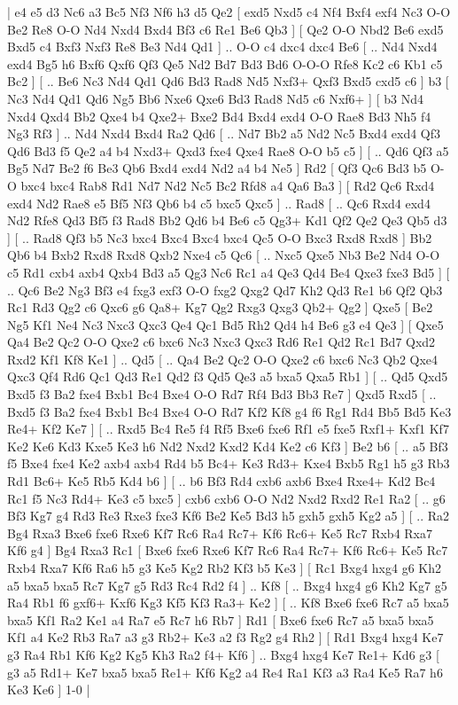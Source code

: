 \makegametitle 
|   e4   e5    d3   Nc6    a3   Bc5    Nf3   Nf6    h3   d5    Qe2 [  exd5 Nxd5  c4 Nf4  Bxf4 exf4  Nc3 O-O  Be2 Re8  O-O Nd4  Nxd4 Bxd4  Bf3 c6  Re1 Be6  Qb3   ]  [  Qe2 O-O  Nbd2 Be6  exd5 Bxd5  c4 Bxf3  Nxf3 Re8  Be3 Nd4  Qd1   ] .. O-O    c4   dxc4    dxc4   Be6 [ .. Nd4  Nxd4 exd4  Bg5 h6  Bxf6 Qxf6  Qf3 Qe5  Nd2 Bd7  Bd3 Bd6  O-O-O Rfe8  Kc2 c6  Kb1 c5  Bc2   ]  [ .. Be6  Nc3 Nd4  Qd1 Qd6  Bd3 Rad8  Nd5 Nxf3+  Qxf3 Bxd5  cxd5 c6   ]  b3 [  Nc3 Nd4  Qd1 Qd6  Ng5 Bb6  Nxe6 Qxe6  Bd3 Rad8  Nd5 c6  Nxf6+   ]  [  b3 Nd4  Nxd4 Qxd4  Bb2 Qxe4  b4 Qxe2+  Bxe2 Bd4  Bxd4 exd4  O-O Rae8  Bd3 Nh5  f4 Ng3  Rf3   ] .. Nd4    Nxd4   Bxd4    Ra2   Qd6 [ .. Nd7  Bb2 a5  Nd2 Nc5  Bxd4 exd4  Qf3 Qd6  Bd3 f5  Qe2 a4  b4 Nxd3+  Qxd3 fxe4  Qxe4 Rae8  O-O b5  c5   ]  [ .. Qd6  Qf3 a5  Bg5 Nd7  Be2 f6  Be3 Qb6  Bxd4 exd4  Nd2 a4  b4 Ne5   ]  Rd2 [  Qf3 Qc6  Bd3 b5  O-O bxc4  bxc4 Rab8  Rd1 Nd7  Nd2 Nc5  Bc2 Rfd8  a4 Qa6  Ba3   ]  [  Rd2 Qc6  Rxd4 exd4  Nd2 Rae8  e5 Bf5  Nf3 Qb6  b4 c5  bxc5 Qxc5   ] .. Rad8 [ .. Qc6  Rxd4 exd4  Nd2 Rfe8  Qd3 Bf5  f3 Rad8  Bb2 Qd6  b4 Be6  c5 Qg3+  Kd1 Qf2  Qe2 Qe3  Qb5 d3   ]  [ .. Rad8  Qf3 b5  Nc3 bxc4  Bxc4 Bxc4  bxc4 Qc5  O-O Bxc3  Rxd8 Rxd8   ]  Bb2   Qb6    b4   Bxb2    Rxd8   Rxd8    Qxb2   Nxe4    c5   Qc6 [ .. Nxc5  Qxe5 Nb3  Be2 Nd4  O-O c5  Rd1 cxb4  axb4 Qxb4  Bd3 a5  Qg3 Nc6  Rc1 a4  Qe3 Qd4  Be4 Qxe3  fxe3 Bd5   ]  [ .. Qc6  Be2 Ng3  Bf3 e4  fxg3 exf3  O-O fxg2  Qxg2 Qd7  Kh2 Qd3  Re1 b6  Qf2 Qb3  Rc1 Rd3  Qg2 c6  Qxc6 g6  Qa8+ Kg7  Qg2 Rxg3  Qxg3 Qb2+  Qg2   ]  Qxe5 [  Be2 Ng5  Kf1 Ne4  Nc3 Nxc3  Qxc3 Qe4  Qc1 Bd5  Rh2 Qd4  h4 Be6  g3 e4  Qe3   ]  [  Qxe5 Qa4  Be2 Qc2  O-O Qxe2  c6 bxc6  Nc3 Nxc3  Qxc3 Rd6  Re1 Qd2  Rc1 Bd7  Qxd2 Rxd2  Kf1 Kf8  Ke1   ] .. Qd5 [ .. Qa4  Be2 Qc2  O-O Qxe2  c6 bxc6  Nc3 Qb2  Qxe4 Qxc3  Qf4 Rd6  Qc1 Qd3  Re1 Qd2  f3 Qd5  Qe3 a5  bxa5 Qxa5  Rb1   ]  [ .. Qd5  Qxd5 Bxd5  f3 Ba2  fxe4 Bxb1  Bc4 Bxe4  O-O Rd7  Rf4 Bd3  Bb3 Re7   ]  Qxd5   Rxd5 [ .. Bxd5  f3 Ba2  fxe4 Bxb1  Bc4 Bxe4  O-O Rd7  Kf2 Kf8  g4 f6  Rg1 Rd4  Bb5 Bd5  Ke3 Re4+  Kf2 Ke7   ]  [ .. Rxd5  Bc4 Re5  f4 Rf5  Bxe6 fxe6  Rf1 e5  fxe5 Rxf1+  Kxf1 Kf7  Ke2 Ke6  Kd3 Kxe5  Ke3 h6  Nd2 Nxd2  Kxd2 Kd4  Ke2 c6  Kf3   ]  Be2   b6 [ .. a5  Bf3 f5  Bxe4 fxe4  Ke2 axb4  axb4 Rd4  b5 Bc4+  Ke3 Rd3+  Kxe4 Bxb5  Rg1 h5  g3 Rb3  Rd1 Bc6+  Ke5 Rb5  Kd4 b6   ]  [ .. b6  Bf3 Rd4  cxb6 axb6  Bxe4 Rxe4+  Kd2 Bc4  Rc1 f5  Nc3 Rd4+  Ke3 c5  bxc5   ]  cxb6   cxb6    O-O   Nd2    Nxd2   Rxd2    Re1   Ra2 [ .. g6  Bf3 Kg7  g4 Rd3  Re3 Rxe3  fxe3 Kf6  Be2 Ke5  Bd3 h5  gxh5 gxh5  Kg2 a5   ]  [ .. Ra2  Bg4 Rxa3  Bxe6 fxe6  Rxe6 Kf7  Rc6 Ra4  Rc7+ Kf6  Rc6+ Ke5  Rc7 Rxb4  Rxa7 Kf6  g4   ]  Bg4   Rxa3    Rc1 [  Bxe6 fxe6  Rxe6 Kf7  Rc6 Ra4  Rc7+ Kf6  Rc6+ Ke5  Rc7 Rxb4  Rxa7 Kf6  Ra6 h5  g3 Ke5  Kg2 Rb2  Kf3 b5  Ke3   ]  [  Rc1 Bxg4  hxg4 g6  Kh2 a5  bxa5 bxa5  Rc7 Kg7  g5 Rd3  Rc4 Rd2  f4   ] .. Kf8 [ .. Bxg4  hxg4 g6  Kh2 Kg7  g5 Ra4  Rb1 f6  gxf6+ Kxf6  Kg3 Kf5  Kf3 Ra3+  Ke2   ]  [ .. Kf8  Bxe6 fxe6  Rc7 a5  bxa5 bxa5  Kf1 Ra2  Ke1 a4  Ra7 e5  Rc7 h6  Rb7   ]  Rd1 [  Bxe6 fxe6  Rc7 a5  bxa5 bxa5  Kf1 a4  Ke2 Rb3  Ra7 a3  g3 Rb2+  Ke3 a2  f3 Rg2  g4 Rh2   ]  [  Rd1 Bxg4  hxg4 Ke7  g3 Ra4  Rb1 Kf6  Kg2 Kg5  Kh3 Ra2  f4+ Kf6   ] .. Bxg4    hxg4   Ke7    Re1+   Kd6    g3    [  g3 a5  Rd1+ Ke7  bxa5 bxa5  Re1+ Kf6  Kg2 a4  Re4 Ra1  Kf3 a3  Ra4 Ke5  Ra7 h6  Ke3 Ke6   ] 1-0  |
